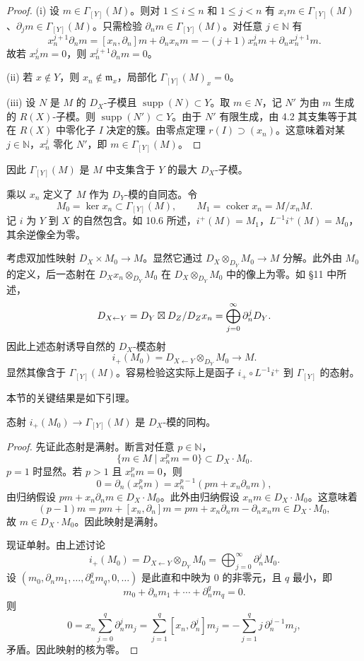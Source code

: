 \begin{proof}
(i) 设 $m\in\Gamma_{[Y]}(M)$。则对 $1\le i\le n$ 和 $1\le j<n$ 有 $x_i m\in\Gamma_{[Y]}(M)$、$\partial_j m\in\Gamma_{[Y]}(M)$。只需检验 $\partial_n m\in\Gamma_{[Y]}(M)$。对任意 $j\in\mathbb{N}$ 有
$$x_n^{j+1}\partial_n m=[x_n,\partial_n]m+\partial_n x_n m=-(j+1)x_n^j m+\partial_n x_n^{j+1}m.$$
故若 $x_n^j m=0$，则 $x_n^{j+1}\partial_n m=0$。

(ii) 若 $x\notin Y$，则 $x_n\notin\mathfrak{m}_x$，局部化 $\Gamma_{[Y]}(M)_x=0$。

(iii) 设 $N$ 是 $M$ 的 $D_X$-子模且 $\operatorname{supp}(N)\subset Y$。取 $m\in N$，记 $N'$ 为由 $m$ 生成的 $R(X)$-子模。则 $\operatorname{supp}(N')\subset Y$。由于 $N'$ 有限生成，由 4.2 其支集等于其在 $R(X)$ 中零化子 $I$ 决定的簇。由零点定理 $r(I)\supset(x_n)$。这意味着对某 $j\in\mathbb{N}$，$x_n^j$ 零化 $N'$，即 $m\in\Gamma_{[Y]}(M)$。
\end{proof}

因此 $\Gamma_{[Y]}(M)$ 是 $M$ 中支集含于 $Y$ 的最大 $D_X$-子模。

乘以 $x_n$ 定义了 $M$ 作为 $D_Y$-模的自同态。令
$$M_0=\ker x_n\subset\Gamma_{[Y]}(M),\qquad M_1=\operatorname{coker} x_n=M/x_nM.$$
记 $i$ 为 $Y$ 到 $X$ 的自然包含。如 10.6 所述，$i^+(M)=M_1$，$L^{-1}i^+(M)=M_0$，其余逆像全为零。

考虑双加性映射 $D_X\times M_0\to M$。显然它通过 $D_X\otimes_{D_Y}M_0\to M$ 分解。此外由 $M_0$ 的定义，后一态射在 $D_Xx_n\otimes_{D_Y}M_0$ 在 $D_X\otimes_{D_Y}M_0$ 中的像上为零。如 §11 中所述，
$$D_{X\leftarrow Y}=D_Y\mathbin{\boxtimes} D_Z/D_Zx_n=\bigoplus_{j=0}^{\infty}\partial_n^jD_Y.$$
因此上述态射诱导自然的 $D_X$-模态射
$$i_+(M_0)=D_{X\leftarrow Y}\otimes_{D_Y}M_0\longrightarrow M.$$
显然其像含于 $\Gamma_{[Y]}(M)$。容易检验这实际上是函子 $i_+\circ L^{-1}i^+$ 到 $\Gamma_{[Y]}$ 的态射。

本节的关键结果是如下引理。

\begin{lemma}
态射 $i_+(M_0)\to\Gamma_{[Y]}(M)$ 是 $D_X$-模的同构。
\end{lemma}

\begin{proof}
先证此态射是满射。断言对任意 $p\in\mathbb{N}$，
$$\{m\in M\mid x_n^p m=0\}\subset D_X\cdot M_0.$$
$p=1$ 时显然。若 $p>1$ 且 $x_n^p m=0$，则
$$0=\partial_n(x_n^p m)=x_n^{p-1}(pm+x_n\partial_n m),$$
由归纳假设 $pm+x_n\partial_n m\in D_X\cdot M_0$。此外由归纳假设 $x_n m\in D_X\cdot M_0$。这意味着
$$(p-1)m=pm+[x_n,\partial_n]m=pm+x_n\partial_n m-\partial_n x_n m\in D_X\cdot M_0,$$
故 $m\in D_X\cdot M_0$。因此映射是满射。

现证单射。由上述讨论
$$i_+(M_0)=D_{X\leftarrow Y}\otimes_{D_Y}M_0=\bigoplus_{j=0}^{\infty}\partial_n^j M_0.$$
设 $(m_0,\partial_n m_1,\dots,\partial_n^q m_q,0,\dots)$ 是此直和中映为 $0$ 的非零元，且 $q$ 最小，即
$$m_0+\partial_n m_1+\cdots+\partial_n^q m_q=0.$$
则
$$0=x_n\sum_{j=0}^q\partial_n^j m_j=\sum_{j=1}^q[x_n,\partial_n^j]m_j=-\sum_{j=1}^q j\,\partial_n^{j-1}m_j,$$
矛盾。因此映射的核为零。
\end{proof}

